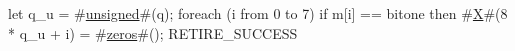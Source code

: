 let q_u = #\hyperref[sailRISCVzunsigned]{unsigned}#(q);
foreach (i from 0 to 7)
  if m[i] == bitone then
    #\hyperref[sailRISCVzX]{X}#(8 * q_u + i) = #\hyperref[sailRISCVzzzeros]{zeros}#();
RETIRE_SUCCESS
